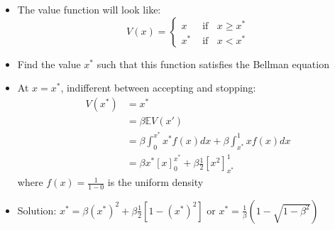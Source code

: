 \documentclass[10pt]{beamer}
\begin{document}
\begin{frame}{}

\begin{itemize}
\item The value function will look like:
\begin{equation*}
	V(x) = \begin{cases} x & \text{ if } \;\; x \geq x^* \\
		x^* & \text{ if } \;\; x < x^* 
		\end{cases}
\end{equation*}

\item Find the value $x^*$ such that this function satisfies the Bellman equation

\item At $x = x^*$, indifferent between accepting and stopping:
\begin{align*}
	V(x^*) &= x^* \\
	&= \beta \mathbb{E} V(x') \\
	&= \beta \int_0^{x^*} x^* f(x) dx + \beta \int_{x^*}^1 x f(x) dx \\
	&= \beta x^*  [x]_0^{x^*} + \beta \frac{1}{2} [x^2]_{x^*}^1
\end{align*}
where $f(x) = \frac{1}{1 - 0}$ is the uniform density

\item Solution: $x^* = \beta (x^*)^2 + \beta \frac{1}{2} [1 - (x^*)^2]$ or $x^* = \frac{1}{\beta} (1 - \sqrt{1 - \beta^2})$

\end{itemize}
\end{frame}















\appendix
\end{document}
